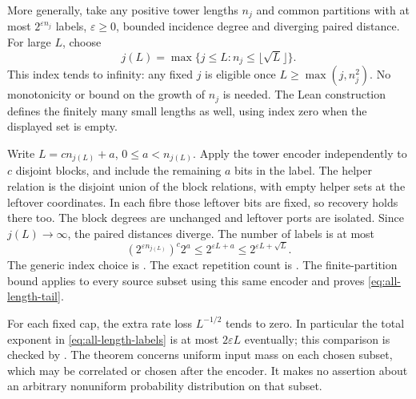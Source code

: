 \begin{outline}
More generally, take any positive tower lengths $n_j$ and common
partitions with at most $2^{\varepsilon n_j}$ labels,
$\varepsilon\ge0$, bounded incidence degree and diverging paired
distance. For large $L$, choose
\[
 j(L)=\max\{j\le L:n_j\le\lfloor\sqrt L\rfloor\}.
\]
This index tends to infinity: any fixed $j$ is eligible once
$L\ge\max(j,n_j^2)$. No monotonicity or bound on the growth of $n_j$
is needed. The Lean construction defines the finitely many small
lengths as well, using index zero when the displayed set is empty.

Write $L=cn_{j(L)}+a$, $0\le a<n_{j(L)}$. Apply the tower encoder
independently to $c$ disjoint blocks, and include the remaining $a$
bits in the label. The helper relation is the disjoint union of the
block relations, with empty helper sets at the leftover coordinates.
In each fibre those leftover bits are fixed, so recovery holds there
too. The block degrees are unchanged and leftover ports are isolated.
Since $j(L)\to\infty$, the paired distances diverge. The number of
labels is at most
\[
 (2^{\varepsilon n_{j(L)}})^c2^a
   \le2^{\varepsilon L+a}\le2^{\varepsilon L+\sqrt L}.
\]
The generic index choice is .
The exact repetition count is
.
The finite-partition bound
 applies to every
source subset using this same encoder and proves
\cref{eq:all-length-tail}.
\end{outline}

For each fixed cap, the extra rate loss $L^{-1/2}$ tends to zero.
In particular the total exponent in \cref{eq:all-length-labels} is
at most $2\varepsilon L$ eventually; this comparison is checked by
.
The theorem concerns uniform input mass on each chosen subset, which
may be correlated or chosen after the encoder. It makes no assertion
about an arbitrary nonuniform probability distribution on that subset.

